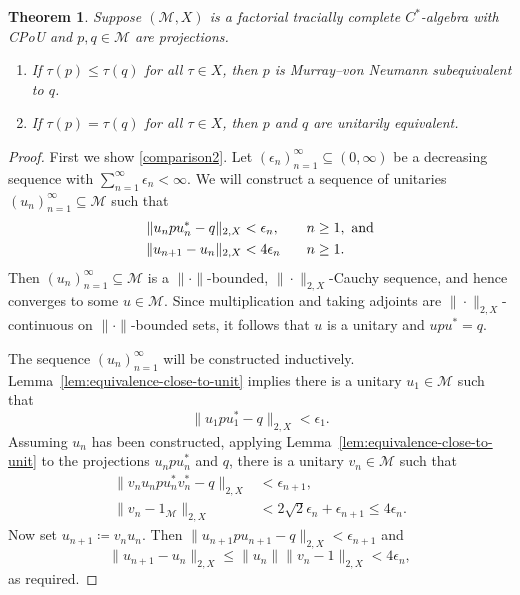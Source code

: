 \documentclass[a4paper,11pt]{amsart}
\newtheorem{theorem}{Theorem}
\theoremstyle{definition}
\numberwithin{equation}{section}
\numberwithin{theorem}{section}
\newcommand{\M}{\mathcal{M}}
\begin{document}
\begin{theorem}\label{thm:comparison}
	Suppose $(\M, X)$ is a factorial tracially complete $C^*$-algebra with CPoU and $p, q \in \M$ are projections.
	\begin{enumerate}
		\item\label{comparison1} If $\tau(p) \leq \tau(q)$ for all $\tau \in X$, then $p$ is Murray--von Neumann subequivalent to $q$.
		\item\label{comparison2} If $\tau(p) = \tau(q)$ for all $\tau \in X$, then $p$ and $q$ are unitarily equivalent.
	\end{enumerate}
\end{theorem}

\begin{proof}
	First we show \ref{comparison2}.  Let $(\epsilon_n)_{n=1}^\infty \subseteq (0, \infty)$ be a decreasing sequence with $\sum_{n=1}^\infty \epsilon_n < \infty$.  We will construct a sequence of unitaries $(u_n)_{n=1}^\infty \subseteq \M$ such that
	\begin{equation}\begin{aligned}
		\|u_n p u_n^* - q\|_{2, X} &< \epsilon_n, &\hspace{2ex}&n \geq 1, \text{ and} \\
		\|u_{n+1} - u_n\|_{2, X} &< 4 \epsilon_n &\hspace{2ex}&n \geq 1.
	\end{aligned}\end{equation}
	Then $(u_n)_{n=1}^\infty \subseteq \M$ is a $\|\cdot\|$-bounded, $\|\cdot\|_{2, X}$-Cauchy sequence, and hence converges to some $u \in \M$. Since multiplication and taking adjoints are $\|\cdot\|_{2,X}$-continuous on $\|\cdot\|$-bounded sets, it follows that $u$ is a unitary and $upu^* = q$.
	
	The sequence $(u_n)_{n=1}^\infty$ will be constructed inductively.  Lemma~\ref{lem:equivalence-close-to-unit} implies there is a unitary $u_1 \in \M$ such that
	\begin{equation}
		\|u_1 p u_1^* - q\|_{2, X} < \epsilon_1.
	\end{equation}
	Assuming $u_n$ has been constructed, applying Lemma~\ref{lem:equivalence-close-to-unit} to the projections $u_npu_n^*$ and $q$, there is a unitary $v_n \in \M$ such that
	\begin{equation}\begin{split}
		\|v_nu_n p u_n^*v_n^* - q\|_{2, X} &< \epsilon_{n+1}, \\ 
		\|v_n - 1_{\M} \|_{2, X} &< 2\sqrt{2}\epsilon_n + \epsilon_{n+1} \leq 4\epsilon_n.
	\end{split}\end{equation}
	Now set $u_{n+1} \coloneqq v_nu_n$. Then $\|u_{n+1} p u_{n+1} - q\|_{2, X} < \epsilon_{n+1}$ and
	\begin{equation}
		\|u_{n+1} - u_n \|_{2, X} \leq \|u_n\|\|v_n - 1\|_{2, X}
		< 4\epsilon_n,
	\end{equation}
	as required.
	

\end{proof}
\end{document}
